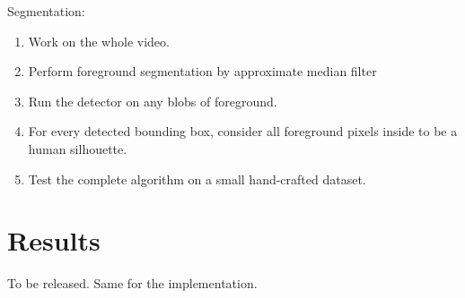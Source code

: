 \documentclass{article}
\begin{document}
Segmentation:
\begin{enumerate}
\item{Work on the whole video.}
\item{Perform foreground segmentation by approximate median filter\cite{amf}}
\item{Run the detector on any blobs of foreground.}
\item{For every detected bounding box, consider all foreground pixels inside to be a human silhouette.}
\item{Test the complete algorithm on a small hand-crafted dataset.}
\end{enumerate}


\section{Results}
To be released.
Same for the implementation.


\printbibliography
\end{document}
